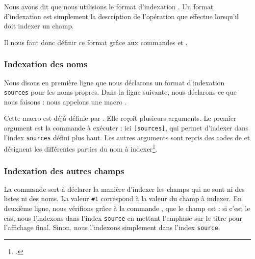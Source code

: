 Nous avons dit que nous utilisions le format d'indexation . Un format d'indexation   est simplement la description de l'opération que  effectue lorsqu'il doit indexer un champ. 

Il nous faut donc définir ce format grâce aux commandes  et .

\subsubsection{Indexation des noms}

\begin{english}
\begin{latexcode}
\end{latexcode}
\end{english}

Nous disons en première ligne que nous déclarons un format d'indexation \verb|sources| pour les noms propres. Dans la ligne suivante, nous déclarons ce que nous faisons : nous appelons une macro . 

Cette macro est déjà définie par . Elle reçoit plusieurs arguments. Le premier argument est la commande à exécuter : ici \verb|[sources]|, qui permet d'indexer dans l'index \verb|sources| défini plus haut. Les autres arguments sont repris des codes de  et désignent les différentes parties du nom à indexer\footcite[Nous renvoyons le lecteur à la documentation de  : ][]{biblatex_formats}.


\subsubsection{Indexation des autres champs}

\begin{latexcode}
\end{latexcode}

La commande  sert à déclarer la manière d'indexer les champs qui ne sont ni des listes ni des noms. La valeur \verb|#1| correspond à la valeur du champ à indexer. En deuxième ligne, nous vérifions grâce à la commande , que le champ    est  : si c'est le cas, nous l'indexons dans l'index \verb|source| en mettant l'emphase sur le titre pour l'affichage final. Sinon, nous l'indexons simplement dans l'index \verb|source|.

